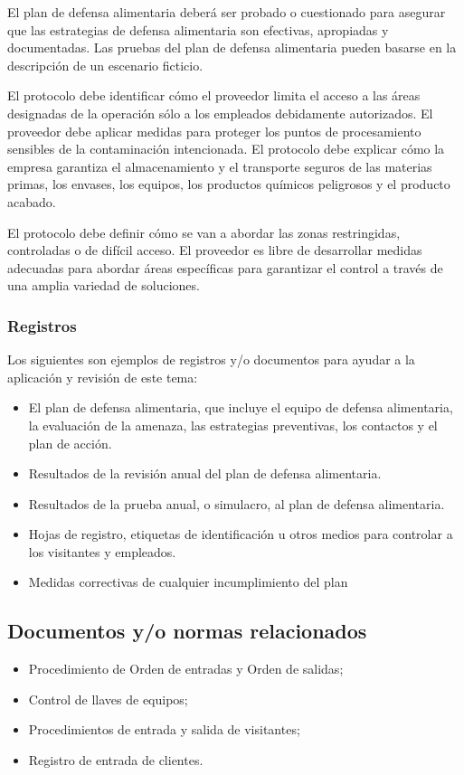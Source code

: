El plan de defensa alimentaria deberá ser probado o cuestionado para asegurar que las estrategias de defensa alimentaria son efectivas, apropiadas y documentadas. Las pruebas del plan de defensa alimentaria pueden basarse en la descripción de un escenario ficticio.

El protocolo debe identificar cómo el proveedor limita el acceso a las áreas designadas de la operación sólo a los empleados debidamente autorizados. El proveedor debe aplicar medidas para proteger los puntos de procesamiento sensibles de la contaminación intencionada. El protocolo debe explicar cómo la empresa garantiza el almacenamiento y el transporte seguros
de las materias primas, los envases, los equipos, los productos químicos peligrosos y el producto
acabado.

El protocolo debe definir cómo se van a abordar las zonas restringidas, controladas o de difícil acceso. El proveedor es libre de desarrollar medidas adecuadas para abordar áreas específicas para garantizar el control a través de una amplia variedad de soluciones.

\subsubsection{Registros}
Los siguientes son ejemplos de registros y/o documentos para ayudar a la aplicación y revisión de este tema: 

\begin{itemize}
	\item El plan de defensa alimentaria, que incluye el equipo de defensa alimentaria, la evaluación de la amenaza, las estrategias preventivas, los contactos y el plan de acción.
	\item Resultados de la revisión anual del plan de defensa alimentaria.
	\item Resultados de la prueba anual, o simulacro, al plan de defensa alimentaria.
	\item Hojas de registro, etiquetas de identificación u otros medios para controlar a los visitantes y empleados.
	\item Medidas correctivas de cualquier incumplimiento del plan
\end{itemize}

\subsection{Documentos y/o normas relacionados}
\begin{itemize}
	\item Procedimiento de Orden de entradas y Orden de salidas;
	\item Control de llaves de equipos;
	\item Procedimientos de entrada y salida de visitantes;
	\item Registro de entrada de clientes.
\end{itemize}

